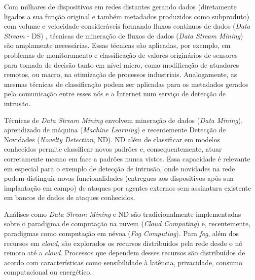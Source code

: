 
Com milhares de dispositivos em redes distantes gerando dados (diretamente
ligados a sua função original e também metadados produzidos como subproduto) com
volume e velocidade consideráveis formando fluxos contínuos de dados (\emph{Data
Stream} - DS) , técnicas de mineração de fluxos de dados
(\emph{Data Stream Mining}) são amplamente necessárias.
Essas técnicas são
aplicadas, por exemplo, em problemas de monitoramento e classificação de valores
originários de sensores para tomada de decisão tanto em nível micro, como
modificação de atuadores remotos, ou macro, na otimização de processos
industriais.
Analogamente, as mesmas técnicas de classificação podem ser aplicadas para os
metadados gerados pela comunicação entre esses nós e a Internet num serviço de
detecção de intrusão.

\newcommand{\nd}{ND}

Técnicas de \emph{Data Stream Mining} envolvem mineração de dados
(\emph{Data Mining}), aprendizado de
máquina (\emph{Machine Learning}) e recentemente Detecção de Novidades
(\emph{Novelty Detection}, \nd).
ND além de classificar em modelos conhecidos
permite classificar novos padrões e, consequentemente, atuar corretamente mesmo
em face a padrões nunca vistos.
Essa capacidade é relevante em especial para o
exemplo de detecção de intrusão, onde novidades na rede podem distinguir novas
funcionalidades (entregues aos dispositivos após sua implantação em campo) de
ataques por agentes externos sem assinatura existente em bancos de
dados de ataques conhecidos.


Análises como \emph{Data Stream Mining} e ND são tradicionalmente implementadas
sobre o paradigma de computação na nuvem
(\emph{Cloud Computing}) e, recentemente, paradigmas como computação em névoa
(\emph{Fog Computing}). Para \emph{fog}, além dos recursos em \emph{cloud}, são
explorados os recursos distribuídos pela rede desde o nó remoto até a
\emph{cloud}. Processos que dependem desses recursos são distribuídos de acordo
com características como sensibilidade à latência, privacidade,
consumo computacional ou energético.

